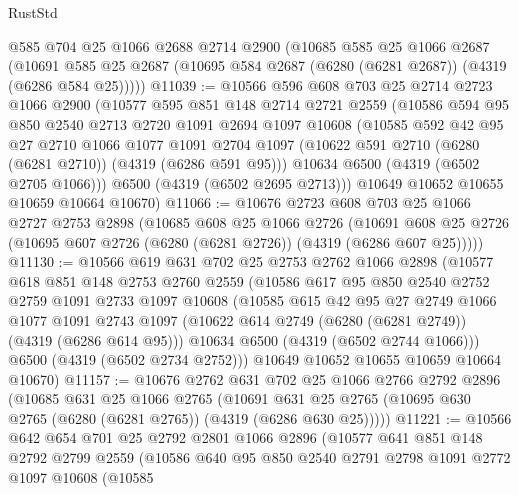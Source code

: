 \begin{lexlean}{RustStd}
\begin{coremodule}
    @585
    @704
    @25
    @1066
    @2688
    @2714
    @2900
    (@10685
      @585
      @25
      @1066
      @2687
      (@10691 @585 @25 @2687 (@10695 @584 @2687 (@6280 (@6281 @2687)) (@4319 (@6286 @584 @25)))))
@11039 := @10566
    @596
    @608
    @703
    @25
    @2714
    @2723
    @1066
    @2900
    (@10577
      @595
      @851
      @148
      @2714
      @2721
      @2559
      (@10586
        @594
        @95
        @850
        @2540
        @2713
        @2720
        @1091
        @2694
        @1097
        @10608
        (@10585
          @592
          @42
          @95
          @27
          @2710
          @1066
          @1077
          @1091
          @2704
          @1097
          (@10622 @591 @2710 (@6280 (@6281 @2710)) (@4319 (@6286 @591 @95)))
          @10634
          @6500
          (@4319 (@6502 @2705 @1066)))
        @6500
        (@4319 (@6502 @2695 @2713)))
      @10649
      @10652
      @10655
      @10659
      @10664
      @10670)
@11066 := @10676
    @2723
    @608
    @703
    @25
    @1066
    @2727
    @2753
    @2898
    (@10685
      @608
      @25
      @1066
      @2726
      (@10691 @608 @25 @2726 (@10695 @607 @2726 (@6280 (@6281 @2726)) (@4319 (@6286 @607 @25)))))
@11130 := @10566
    @619
    @631
    @702
    @25
    @2753
    @2762
    @1066
    @2898
    (@10577
      @618
      @851
      @148
      @2753
      @2760
      @2559
      (@10586
        @617
        @95
        @850
        @2540
        @2752
        @2759
        @1091
        @2733
        @1097
        @10608
        (@10585
          @615
          @42
          @95
          @27
          @2749
          @1066
          @1077
          @1091
          @2743
          @1097
          (@10622 @614 @2749 (@6280 (@6281 @2749)) (@4319 (@6286 @614 @95)))
          @10634
          @6500
          (@4319 (@6502 @2744 @1066)))
        @6500
        (@4319 (@6502 @2734 @2752)))
      @10649
      @10652
      @10655
      @10659
      @10664
      @10670)
@11157 := @10676
    @2762
    @631
    @702
    @25
    @1066
    @2766
    @2792
    @2896
    (@10685
      @631
      @25
      @1066
      @2765
      (@10691 @631 @25 @2765 (@10695 @630 @2765 (@6280 (@6281 @2765)) (@4319 (@6286 @630 @25)))))
@11221 := @10566
    @642
    @654
    @701
    @25
    @2792
    @2801
    @1066
    @2896
    (@10577
      @641
      @851
      @148
      @2792
      @2799
      @2559
      (@10586
        @640
        @95
        @850
        @2540
        @2791
        @2798
        @1091
        @2772
        @1097
        @10608
        (@10585

\end{coremodule}
\end{lexlean}
